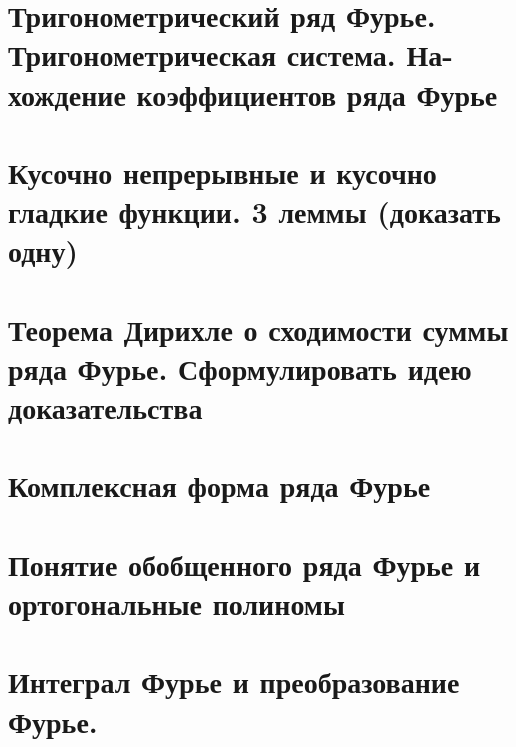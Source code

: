 \documentclass[11pt]{article}
\begin{document}
\section{Тригонометрический ряд Фурье. Тригонометрическая система. На-хождение коэффициентов ряда Фурье}

\section{ Кусочно непрерывные и кусочно гладкие функции. 3 леммы (доказать одну)}

\section{Теорема Дирихле о сходимости суммы ряда Фурье. Сформулировать идею доказательства}

\section{Комплексная форма ряда Фурье}

\section{Понятие обобщенного ряда Фурье и ортогональные полиномы}

\section{Интеграл Фурье и преобразование Фурье.}

\end{document}
